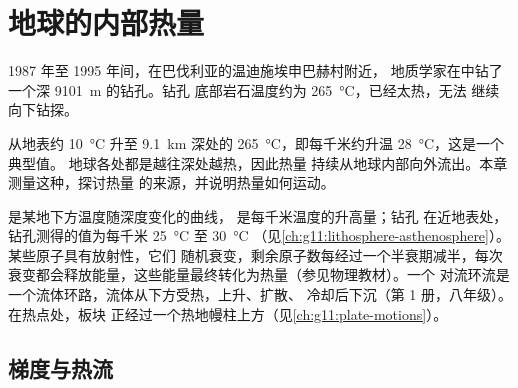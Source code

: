 \chapter{地球的内部热量}\label{ch:g12:internal-heat}

1987 年至 1995 年间，在巴伐利亚的温迪施埃申巴赫村附近，
地质学家在中钻了一个深 \qty{9101}{m} 的钻孔。钻孔
底部岩石温度约为 \qty{265}{\celsius}，已经太热，无法
继续向下钻探。

从地表约 \qty{10}{\celsius} 升至
\qty{9.1}{km} 深处的 \qty{265}{\celsius}，即每千米约升温 \qty{28}{\celsius}，这是一个典型值。
地球各处都是越往深处越热，因此热量
持续从地球内部向外流出。本章测量这种，探讨热量
的来源，并说明热量如何运动。

\begin{recall}
是某地下方温度随深度变化的曲线，
是每千米温度的升高量；钻孔
在近地表处，钻孔测得的值为每千米 \qty{25}{\celsius} 至 \qty{30}{\celsius}
（见\cref{ch:g11:lithosphere-asthenosphere}）。某些原子具有放射性，它们
随机衰变，剩余原子数每经过一个半衰期减半，每次
衰变都会释放能量，这些能量最终转化为热量（参见物理教材）。一个
对流环流是一个流体环路，流体从下方受热，上升、扩散、
冷却后下沉（第 1 册，八年级）。在热点处，板块
正经过一个热地幔柱上方（见\cref{ch:g11:plate-motions}）。
\end{recall}

\section{梯度与热流}

